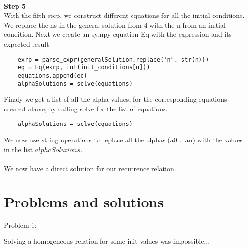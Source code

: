 \documentclass{article}
\begin{document}
\\
\newpage
\textbf{Step 5}\\
With the fifth step, we construct different equations for all the initial conditions. We replace the ns in the general solution from 4 with the n from an initial condition. Next we create an sympy equation Eq with the expression and its expected result.
\begin{verbatim}
    exrp = parse_expr(generalSolution.replace("n", str(n)))
    eq = Eq(exrp, int(init_conditions[n]))
    equations.append(eq)
    alphaSolutions = solve(equations)
\end{verbatim}
Finaly we get a list of all the alpha values, for the corresponding equations created above, by calling solve for the list of equations:
\begin{verbatim}
    alphaSolutions = solve(equations)
\end{verbatim}
We now use string operations to replace all the alphas (a0 .. an) with the values in the list $alphaSolutions$.\\
\\
We now have a direct solution for our recurrence relation.

\newpage
\section{Problems and solutions}
Problem 1:

Solving a homogeneous relation for some init values was impossible...
\end{document}
